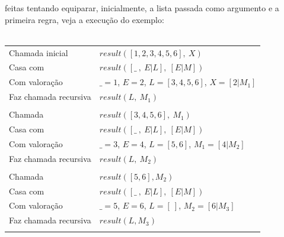 \documentclass[12pt]{article}
\begin{document}
\begin{itemize}
\begin{itemize}
					feitas tentando equiparar, inicialmente, a lista passada como argumento e a 
					primeira regra, veja a execução do exemplo:\\ \\
					\begin{tabular}{ll}
						Chamada inicial & $result([1, 2, 3, 4, 5, 6], \ X)$\\
						Casa com & $result([\_ \ ,  \ E | L], \ [E | M])$\\
						Com valoração & $\_ = 1$, $E = 2$, $L = [3, 4, 5, 6]$, $X = [2|M_1]$\\
						Faz chamada recursiva & $result(L, \ M_1)$\\ \\
						
						Chamada & $result([3, 4, 5, 6], \ M_1)$\\
						Casa com & $result([\_ \ ,  \ E | L], \ [E | M])$\\
						Com valoração & $\_ = 3$, $E = 4$, $L = [5, 6]$, $M_1 = [4|M_2]$\\
						Faz chamada recursiva & $result(L, \ M_2)$\\ \\
						
						Chamada & $result([5, 6], M_2)$\\
						Casa com & $result([\_ \ ,  \ E | L], \ [E | M])$\\
						Com valoração & $\_ = 5$, $E = 6$, $L = [ \ ]$, $M_2 = [6|M_3]$\\
						Faz chamada recursiva & $result(L, M_3)$\\ \\
						

\end{tabular}
\end{itemize}
\end{itemize}
\end{document}
